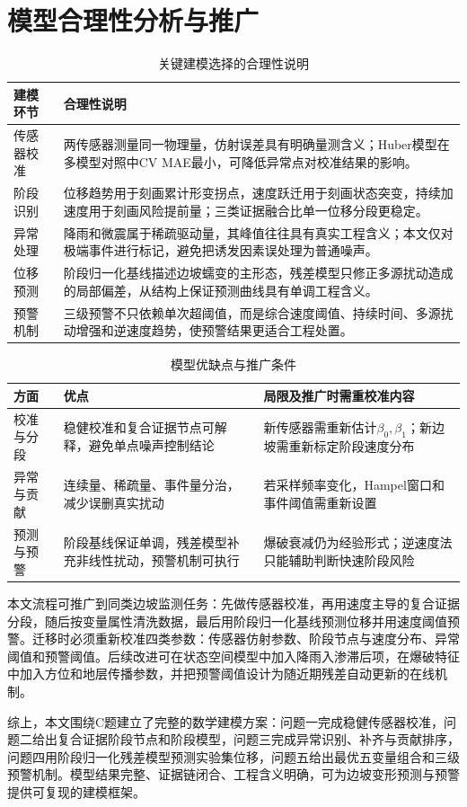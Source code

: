 \section{模型合理性分析与推广}

\begin{table}[H]
\centering
\footnotesize
\caption{关键建模选择的合理性说明}
\label{tab:model_rationality}
\begin{tabularx}{0.92\textwidth}{L{2.0cm}X}
\toprule
建模环节 & 合理性说明 \\
\midrule
传感器校准 & 两传感器测量同一物理量，仿射误差具有明确量测含义；Huber模型在多模型对照中CV MAE最小，可降低异常点对校准结果的影响。 \\
阶段识别 & 位移趋势用于刻画累计形变拐点，速度跃迁用于刻画状态突变，持续加速度用于刻画风险提前量；三类证据融合比单一位移分段更稳定。 \\
异常处理 & 降雨和微震属于稀疏驱动量，其峰值往往具有真实工程含义；本文仅对极端事件进行标记，避免把诱发因素误处理为普通噪声。 \\
位移预测 & 阶段归一化基线描述边坡蠕变的主形态，残差模型只修正多源扰动造成的局部偏差，从结构上保证预测曲线具有单调工程含义。 \\
预警机制 & 三级预警不只依赖单次超阈值，而是综合速度阈值、持续时间、多源扰动增强和逆速度趋势，使预警结果更适合工程处置。 \\
\bottomrule
\end{tabularx}
\end{table}

\begin{table}[H]
\centering
\footnotesize
\caption{模型优缺点与推广条件}
\label{tab:model_pros_cons}
\begin{tabularx}{0.98\textwidth}{L{2.0cm}X X}
\toprule
方面 & 优点 & 局限及推广时需重校准内容 \\
\midrule
校准与分段 & 稳健校准和复合证据节点可解释，避免单点噪声控制结论 & 新传感器需重新估计$\beta_0,\beta_1$；新边坡需重新标定阶段速度分布 \\
异常与贡献 & 连续量、稀疏量、事件量分治，减少误删真实扰动 & 若采样频率变化，Hampel窗口和事件阈值需重新设置 \\
预测与预警 & 阶段基线保证单调，残差模型补充非线性扰动，预警机制可执行 & 爆破衰减仍为经验形式；逆速度法只能辅助判断快速阶段风险 \\
\bottomrule
\end{tabularx}
\end{table}

本文流程可推广到同类边坡监测任务：先做传感器校准，再用速度主导的复合证据分段，随后按变量属性清洗数据，最后用阶段归一化基线预测位移并用速度阈值预警。迁移时必须重新校准四类参数：传感器仿射参数、阶段节点与速度分布、异常阈值和预警阈值。后续改进可在状态空间模型中加入降雨入渗滞后项，在爆破特征中加入方位和地层传播参数，并把预警阈值设计为随近期残差自动更新的在线机制。

综上，本文围绕C题建立了完整的数学建模方案：问题一完成稳健传感器校准，问题二给出复合证据阶段节点和阶段模型，问题三完成异常识别、补齐与贡献排序，问题四用阶段归一化残差模型预测实验集位移，问题五给出最优五变量组合和三级预警机制。模型结果完整、证据链闭合、工程含义明确，可为边坡变形预测与预警提供可复现的建模框架。

